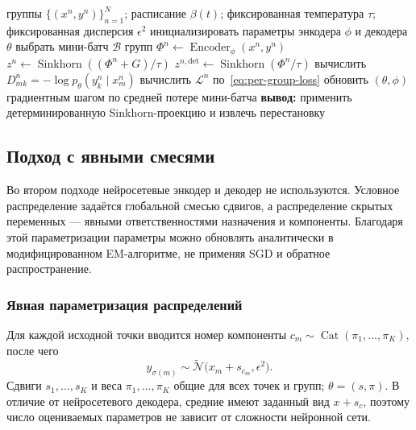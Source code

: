\begin{algorithm}[H]
\caption{Нейросетевой вариационный подход с Gumbel--Sinkhorn-релаксацией}
\label{alg:catvae}
\begin{algorithmic}[1]
\Require группы $\{(x^n,y^n)\}_{n=1}^{N}$; расписание $\beta(t)$; фиксированная
температура $\tau$; фиксированная дисперсия $\epsilon^2$
\State инициализировать параметры энкодера $\phi$ и декодера $\theta$
  \State выбрать мини-батч $\mathcal{B}$ групп
    \State $\Phi^n\gets\operatorname{Encoder}_\phi(x^n,y^n)$
    \State $z^n\gets\operatorname{Sinkhorn}((\Phi^n+G)/\tau)$
    \State $z^{n,\mathrm{det}}\gets\operatorname{Sinkhorn}(\Phi^n/\tau)$
    \State вычислить $D^n_{mk}=-\log p_\theta(y^n_k\mid x^n_m)$
    \State вычислить $\mathcal{L}^n$ по~\eqref{eq:per-group-loss}
  \EndFor
  \State обновить $(\theta,\phi)$ градиентным шагом по средней потере мини-батча
\EndFor
\State \textbf{вывод:} применить детерминированную Sinkhorn-проекцию и извлечь перестановку
\end{algorithmic}
\end{algorithm}

\subsection{Подход с явными смесями}
\label{ssec:em}

Во втором подходе нейросетевые энкодер и декодер не используются. Условное распределение
задаётся глобальной смесью сдвигов, а распределение скрытых переменных --- явными
ответственностями назначения и компоненты. Благодаря этой параметризации параметры можно
обновлять аналитически в модифицированном EM-алгоритме, не применяя SGD и обратное
распространение.

\subsubsection{Явная параметризация распределений}

Для каждой исходной точки вводится номер компоненты
$c_m\sim\operatorname{Cat}(\pi_1,\dots,\pi_K)$, после чего
\begin{equation}
y_{\sigma(m)}\sim
\tilde{\mathcal{N}}\bigl(x_m+s_{c_m},\epsilon^2\bigr).
\label{eq:shift-model}
\end{equation}
Сдвиги $s_1,\dots,s_K$ и веса $\pi_1,\dots,\pi_K$ общие для всех точек и групп;
$\theta=(s,\pi)$. В отличие от нейросетевого декодера, средние имеют заданный вид
$x+s_c$, поэтому число оцениваемых параметров не зависит от сложности нейронной сети.

